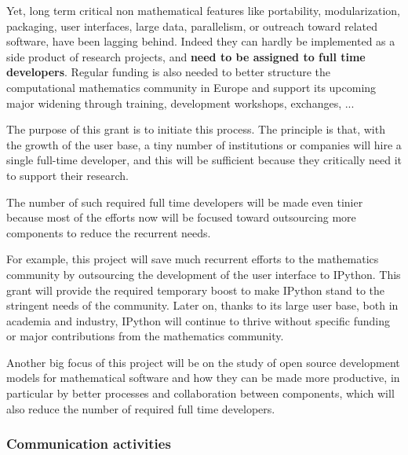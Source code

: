 \documentclass[a4paper,11pt]{article}
\begin{document}

Yet, long term critical non mathematical features like portability,
modularization, packaging, user interfaces, large data, parallelism,
or outreach toward related software, have been lagging behind. Indeed
they can hardly be implemented as a side product of research projects,
and \textbf{need to be assigned to full time developers}. Regular
funding is also needed to better structure the computational
mathematics community in Europe and support its upcoming major
widening through training, development workshops, exchanges, ...

The purpose of this grant is to initiate this process. The principle
is that, with the growth of the user base, a tiny number of
institutions or companies will hire a single full-time developer, and
this will be sufficient because they critically need it to support
their research.

The number of such required full time developers will be made even
tinier because most of the efforts now will be focused toward
outsourcing more components to reduce the recurrent needs.

For example, this project will save much recurrent efforts to the
mathematics community by outsourcing the development of the user
interface to IPython. This grant will provide the required temporary
boost to make IPython stand to the stringent needs of the community.
Later on, thanks to its large user base, both in academia and
industry, IPython will continue to thrive without specific funding or
major contributions from the mathematics community.

Another big focus of this project will be on the study of open source
development models for mathematical software and how they can be made
more productive, in particular by better processes and collaboration
between components, which will also reduce the number of required full
time developers.

\draftpage

\subsubsection{Communication activities}
\label{subsubsect:communication}

\end{document}

